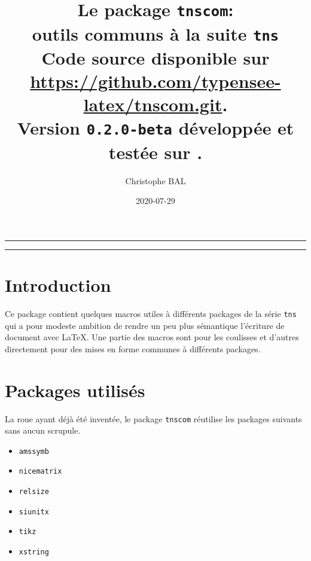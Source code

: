 \documentclass[12pt,a4paper]{article}
\theoremstyle{definition}
\begin{document}
\renewcommand\labelitemi{\raisebox{0.125em}{\tiny\textbullet}}
\renewcommand{\labelitemii}{---}

\title{  %
	Le package \texttt{tnscom}:\\%
	outils communs à la suite \texttt{tns}\\%
	{\footnotesize Code source disponible sur \url{https://github.com/typensee-latex/tnscom.git}.}\\%
{\footnotesize Version \texttt{0.2.0-beta} développée et testée sur \macosxname{}.}%
}
\author{Christophe BAL}
\date{2020-07-29}{{{{{{{{{{{

\maketitle


\vspace{2em}

\hrule

\tableofcontents

\vspace{1.5em}

\hrule

\newpage

\section{Introduction}

Ce package contient quelques macros utiles à différents packages de la série \verb#tns# qui a pour modeste ambition de rendre un peu plus sémantique l'écriture de document avec \LaTeX.
Une partie des macros sont pour les coulisses et d'autres directement pour des mises en forme communes à différents packages.


\section{Packages utilisés}

La roue ayant déjà été inventée, le package \verb#tnscom# réutilise les packages suivants sans aucun scrupule.

\begin{multicols}{4}
    \begin{itemize}
\item \verb#amssymb#
    \item \verb#nicematrix#
    \item \verb#relsize#
    \item \verb#siunitx#
    \item \verb#tikz#
    \item \verb#xstring#
    \end{itemize}
\end{multicols}
}}}}}}}}}}}
\end{document}
